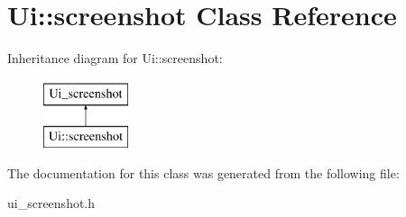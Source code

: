 \hypertarget{classUi_1_1screenshot}{
\section{Ui::screenshot Class Reference}
\label{classUi_1_1screenshot}
}
Inheritance diagram for Ui::screenshot:\begin{figure}[H]
\begin{center}
\leavevmode
\includegraphics[height=2.000000cm]{classUi_1_1screenshot}
\end{center}
\end{figure}


The documentation for this class was generated from the following file:\begin{DoxyCompactItemize}
\item 
ui\_\-screenshot.h\end{DoxyCompactItemize}
